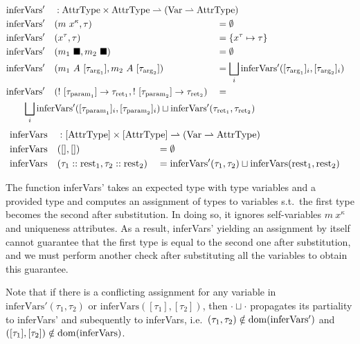 \newcommand{\inferVarsDash}{\mathrm{inferVars'}}
\newcommand{\inferVars}{\mathrm{inferVars}}
\begin{alignat*}{3}
	&\inferVarsDash &&: \mathrlap{\AttrType \times \AttrType \rightharpoonup (\Var \rightharpoonup \AttrType)} \\
	&\inferVarsDash&&(m\ x^\kappa, \tau) &&= \emptyset \\
	&\inferVarsDash&&(x^\tau, \tau) &&= \{ x^\tau \mapsto \tau \} \\
	&\inferVarsDash&&(m_1\ \blacksquare, m_2\ \blacksquare) &&= \emptyset \\
	&\inferVarsDash&&(m_1\ A\ [\tau_{\arrg_1}], m_2\ A\ [\tau_{\arrg_2}]) &&= \bigsqcup_i \inferVarsDash([\tau_{\arrg_1}]_i, [\tau_{\arrg_2}]_i) \\
	&\inferVarsDash&&(!\ [\tau_{\param_1}] \to \tau_{\ret_1}, !\ [\tau_{\param_2}] \to \tau_{\ret_2}) &&= \\
	&\rebreak{\bigsqcup_i \inferVarsDash([\tau_{\param_1}]_i, [\tau_{\param_2}]_i) \sqcup \inferVarsDash(\tau_{\ret_1}, \tau_{\ret_2})}
\end{alignat*}
\vspace{-1em}\begin{alignat*}{3}
	&\inferVars &&: \mathrlap{[\AttrType] \times [\AttrType] \rightharpoonup (\Var \rightharpoonup \AttrType)} \\
	&\inferVars&&([], []) &&= \emptyset \\
	&\inferVars&&(\tau_1 :: \rest_1, \tau_2 :: \rest_2) &&= \inferVarsDash(\tau_1, \tau_2) \sqcup \inferVars(\rest_1, \rest_2)
\end{alignat*}

The function inferVars' takes an expected type with type variables and a provided type and computes an assignment of types to variables s.t.\ the first type becomes the second after substitution. In doing so, it ignores self-variables $m\ x^\kappa$ and uniqueness attributes. As a result, inferVars' yielding an assignment by itself cannot guarantee that the first type is equal to the second one after substitution, and we must perform another check after substituting all the variables to obtain this guarantee. 

Note that if there is a conflicting assignment for any variable in $\inferVarsDash(\tau_1, \tau_2)$ or $\inferVars([\tau_1], [\tau_2])$, then $\cdot \sqcup \cdot$ propagates its partiality to inferVars' and subequently to inferVars, i.e.\ $(\tau_1, \tau_2) \notin \dom(\inferVarsDash)$ and $([\tau_1], [\tau_2]) \notin \dom(\inferVars)$.

